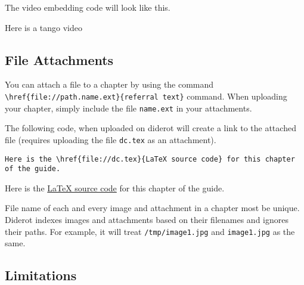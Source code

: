 \begin{example}
The video embedding code will look like this.

Here is a tango video 
%

\end{example}

\subsection{File Attachments}

You can attach a file to a chapter by using the command \lstinline`\href{file://path.name.ext}{referral text}` command.
%
When uploading your chapter, simply include the file \lstinline{name.ext} in your attachments.
%


\begin{example}
The following code, when uploaded on diderot will create a link to the attached file (requires uploading the file \lstinline`dc.tex` as an attachment).  
%
\begin{lstlisting}
Here is the \href{file://dc.tex}{LaTeX source code} for this chapter of the guide.
\end{lstlisting}

Here is the \href{file://dc.tex}{LaTeX source code} for this chapter of the guide.
\end{example}


\begin{important}
File name of each and every image and attachment in a chapter most be unique.
%
Diderot indexes images and attachments based on their filenames and ignores their paths.
%
For example, it will treat
%
\lstinline`/tmp/image1.jpg` and  \lstinline`image1.jpg` 
%
as the same.

\end{important}

\subsection{Limitations}
\label{sec:mtl::limitations}

